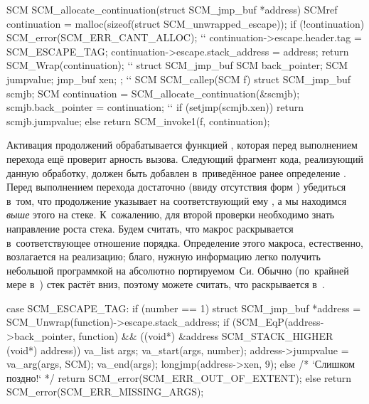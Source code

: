\begin{code:c}
SCM SCM_allocate_continuation(struct SCM_jmp_buf *address)
{
    SCMref continuation = malloc(sizeof(struct SCM_unwrapped_escape));
    if (!continuation)
    {
        SCM_error(SCM_ERR_CANT_ALLOC);
    }
``
    continuation->escape.header.tag    = SCM_ESCAPE_TAG;
    continuation->escape.stack_address = address;
    return SCM_Wrap(continuation);
}
``
struct SCM_jmp_buf {
    SCM back_pointer;
    SCM jumpvalue;
    jmp_buf xen;
};
``
SCM SCM_callep(SCM f)
{
    struct SCM_jmp_buf scmjb;
    SCM continuation = SCM_allocate_continuation(&scmjb);
    scmjb.back_pointer = continuation;
``
    if (setjmp(scmjb.xen)) {
        return scmjb.jumpvalue;
    }
    else {
        return SCM_invoke1(f, continuation);
    }
}
\end{code:c}

Активация продолжений обрабатывается функцией , которая перед
выполнением перехода ещё проверит арность вызова. Следующий фрагмент кода,
реализующий данную обработку, должен быть добавлен в~приведённое ранее
определение . Перед выполнением перехода достаточно (ввиду
отсутствия форм ) убедиться в~том, что продолжение указывает
на соответствующий ему , а мы находимся \emph{выше} этого
 на стеке. К~сожалению, для второй проверки необходимо знать
направление роста стека. Будем считать, что макрос 
раскрывается в~соответствующее отношение порядка. Определение этого макроса,
естественно, возлагается на реализацию; благо, нужную информацию легко получить
небольшой программкой на абсолютно портируемом~Си. Обычно (по~крайней мере
в~\UNIX) стек растёт вниз, поэтому можете считать, что 
раскрывается в~\ic{<=}.

\begin{code:c}
    case SCM_ESCAPE_TAG:
      if (number == 1) {
          struct SCM_jmp_buf *address =
              SCM_Unwrap(function)->escape.stack_address;
          if (SCM_EqP(address->back_pointer, function) &&
              ((void*) &address SCM_STACK_HIGHER (void*) address))
          {
              va_list args;
              va_start(args, number);
              address->jumpvalue = va_arg(args, SCM);
              va_end(args);
              longjmp(address->xen, 9);
          }
          else {
              /* `Слишком поздно!` */
              return SCM_error(SCM_ERR_OUT_OF_EXTENT);
          }
      }
      else {
          return SCM_error(SCM_ERR_MISSING_ARGS);
      }
\end{code:c}

